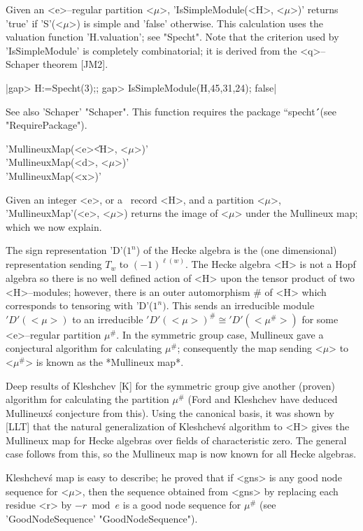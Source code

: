 Given an <e>--regular partition <$\mu$>, 'IsSimpleModule(<H>, <$\mu$>)' 
returns 'true' if 'S'(<$\mu$>) is simple and 'false' otherwise.  This 
calculation uses the valuation function 'H.valuation'; see "Specht". Note 
that the criterion used by 'IsSimpleModule' is completely combinatorial; 
it is derived from the <q>--Schaper theorem [JM2].

|gap> H:=Specht(3);;
gap> IsSimpleModule(H,45,31,24);
false|

See also 'Schaper' "Schaper".  This function requires the package 
``specht\'\'\ (see "RequirePackage").



'MullineuxMap(<e>\|<H>, <$\mu$>)'\\
'MullineuxMap(<d>, <$\mu$>)'\\
'MullineuxMap(<x>)'

Given an integer <e>, or a \Specht\ record <H>, and a partition <$\mu$>,
'MullineuxMap'(<e>, <$\mu$>) returns the image of <$\mu$> under the Mullineux
map; which we now explain.

The sign representation 'D'($1^n$) of the Hecke algebra is the (one 
dimensional) representation sending $T_w$ to $(-1)^{\ell(w)}$. The Hecke
algebra <H> is not a Hopf algebra so there is no well defined action of 
<H> upon the tensor product of two <H>--modules; however, there is an 
outer automorphism \# of <H> which corresponds to tensoring with 
'D'($1^n)$.  This sends an irreducible module $'D'(<\mu>)$ to an 
irreducible $'D'(<\mu>)^\#\cong 'D'(<\mu^\#>)$ for some <e>--regular 
partition $\mu^\#$. In the symmetric group case, Mullineux gave a
conjectural algorithm for calculating $\mu^\#$; consequently the map 
sending <$\mu$> to <$\mu^\#$> is known as the *Mullineux map*.

Deep results of Kleshchev [K] for the symmetric group give another 
(proven) algorithm for calculating the partition $\mu^\#$ (Ford and 
Kleshchev have deduced Mullineux\'s conjecture from this). Using the 
canonical basis, it was shown by [LLT] that the natural generalization
of Kleshchev\'s algorithm to <H> gives the Mullineux map for Hecke 
algebras over fields of characteristic zero. The general case follows from
this, so the Mullineux map is now known for all Hecke algebras.

Kleshchev\'s map is easy to describe; he proved that if <gns> is any 
good node sequence for <$\mu$>, then the sequence obtained from <gns> by 
replacing each residue <r> by $-r\bmod e$ is a good node sequence for 
$\mu^\#$ (see 'GoodNodeSequence' "GoodNodeSequence"). 

